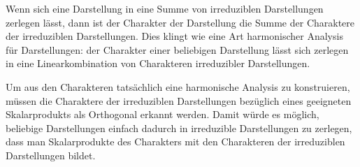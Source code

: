 Wenn sich eine Darstellung in eine Summe von irreduziblen Darstellungen
zerlegen lässt, dann ist der Charakter der Darstellung die Summe der
Charaktere der irreduziblen Darstellungen.
Dies klingt wie eine Art harmonischer Analysis für Darstellungen: der
Charakter einer beliebigen Darstellung lässt sich zerlegen in eine
Linearkombination von Charakteren irreduzibler Darstellungen.

Um aus den Charakteren tatsächlich eine harmonische Analysis zu konstruieren,
müssen die Charaktere der irreduziblen Darstellungen bezüglich eines
geeigneten Skalarprodukts als Orthogonal erkannt werden.
Damit würde es möglich, beliebige Darstellungen einfach dadurch in
irreduzible Darstellungen zu zerlegen, dass man Skalarprodukte des
Charakters mit den Charakteren der irreduziblen Darstellungen bildet.

